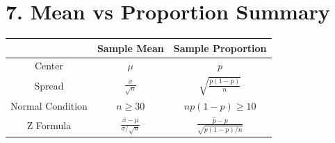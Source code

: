 \documentclass{article}
\begin{document}
\bigskip

\section*{7. Mean vs Proportion Summary}

\begin{center}
\begin{tabular}{c|c|c}
 & \textbf{Sample Mean} & \textbf{Sample Proportion} \\ \hline
Center & $\mu$ & $p$ \\
Spread & $\frac{\sigma}{\sqrt{n}}$ & $\sqrt{\frac{p(1-p)}{n}}$ \\
Normal Condition & $n \ge 30$ & $np(1-p) \ge 10$ \\
Z Formula & $\frac{\bar{x}-\mu}{\sigma/\sqrt{n}}$ 
& $\frac{\hat{p}-p}{\sqrt{p(1-p)/n}}$ \\
\end{tabular}
\end{center}
\end{document}
